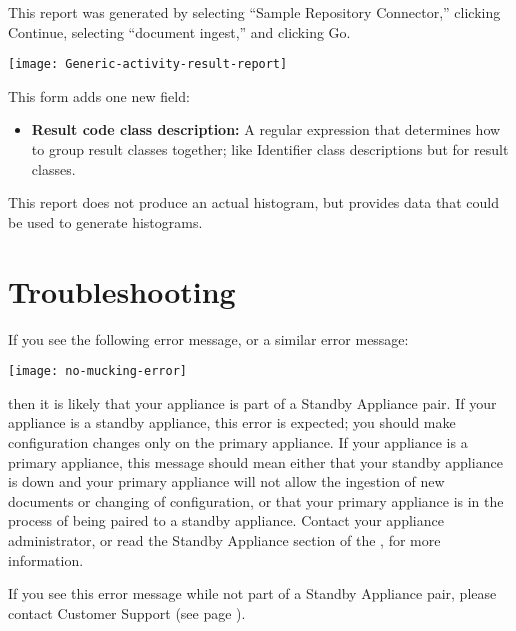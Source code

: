 \begin{changemargin}{1.5in}{0in}
This report was generated by selecting ``Sample Repository Connector,''
clicking Continue, selecting ``document ingest,'' and clicking Go.

\texttt{[image: Generic-activity-result-report]}

This form adds one new field:

\begin{itemize}

\item \textbf{Result code class description:} A regular expression that
determines how to group result classes together; like Identifier class
descriptions but for result classes.

\end{itemize}

This report does not produce an actual histogram, but provides data that
could be used to generate histograms.  

\section{Troubleshooting}

If you see the following error message, or a similar error message:

\texttt{[image: no-mucking-error]}

then it is likely that your appliance is part of a Standby Appliance
pair. If your appliance is a standby appliance, this error is expected;
you should make configuration changes only on the primary appliance.
If your appliance is a primary appliance, this message should mean either
that your standby appliance is down and your primary appliance will
not allow the ingestion of new documents or changing of configuration,
or that your primary appliance is in the process of being paired to
a standby appliance. Contact your appliance administrator, or read
the Standby Appliance section of the , for more information.

If you see this error message while not part of a Standby
Appliance pair, please contact Customer Support (see page \pageref{SupportContact}).

\end{changemargin}
